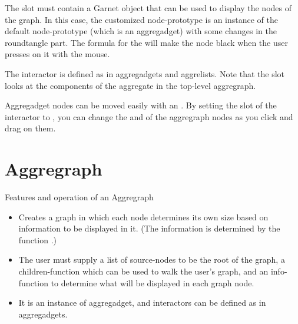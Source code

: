 The  slot must contain a Garnet object that can be used
to display the nodes of the graph.  In this case, the customized
node-prototype is an instance of the default node-prototype (which is an
aggregadget) with some changes in the roundtangle part.
The formula for the  will make the node black
when the user presses on it with the mouse.

The interactor is defined as in aggregadgets and aggrelists.
Note that the  slot looks at the
components of the  aggregate in the top-level aggregraph.

Aggregadget nodes can be moved easily with an .
By setting the  slot of the interactor to
, you can change the  and  of the
aggregraph nodes as you click and drag on them.


\section{Aggregraph}
\label{aggregraph-slots}

Features and operation of an Aggregraph
        \begin{itemize}
\item                 Creates a graph in which each node determines its own
                size based on information to be displayed in it.
                (The information is determined by the function
                .)

\item                 The user must supply a list of source-nodes to be the
                root of the graph, a children-function which can
                be used to walk the user's graph, and an info-function to
                determine what will be displayed in each graph node.

\item                 It is an instance of aggregadget, and interactors can be
                defined as in aggregadgets.
        \end{itemize}

